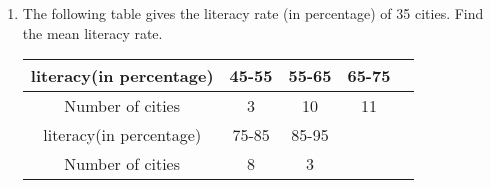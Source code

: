 \renewcommand{\theequation}{\theenumi}
\begin{enumerate}[label=\arabic*.,ref=\thesubsection.\theenumi]
	\item The following table gives the literacy rate (in percentage) of 35 cities. Find the mean
	literacy rate.
	\begin{tabular}{|c|c|c|c|c|}
	\hline
	literacy(in percentage)&45-55&55-65&65-75\\
	\hline
	Number of cities&3&10&11\\
	\hline
	literacy(in percentage)&75-85&85-95&\\
	\hline
	Number of cities&8&3&\\
	\hline
	\end{tabular}\\\\
\end{enumerate}